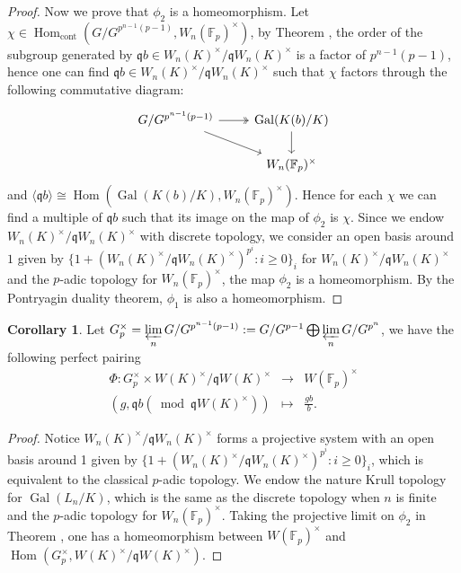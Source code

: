 \documentclass{proc-l}
\theoremstyle{definition}
\newtheorem{corollary}[theorem]{Corollary}
\theoremstyle{remark}
\numberwithin{equation}{section}
\DeclareMathOperator{\Gal}{Gal}
\DeclareMathOperator{\Hom}{Hom}
\DeclareMathOperator{\cont}{cont}
\begin{document}
{\begin{proof}
Now we prove that $\phi_2$ is a homeomorphism. %
Let $\chi\in \Hom_{\cont}(G/G^{p^{n-1}(p-1)},W_n(\mathbb F_p)^\times)$, by Theorem \boxed{\ref{038}}, the order of the subgroup generated by $\mathfrak qb\in W_n(K)^\times/\mathfrak qW_n(K)^\times$ is a factor of $p^{n-1}(p-1)$, hence one can find $\mathfrak qb\in W_n(K)^\times/\mathfrak qW_n(K)^\times$ such that $\chi$ factors through the following commutative diagram:
$$\begin{tikzcd}
  G/G^{p^{n-1}(p-1)} \arrow[r, twoheadrightarrow] \arrow[dr, rightarrow]
    & \Gal(K( b)/K) \arrow[d]\\
&W_n(\mathbb F_p)^\times \end{tikzcd}$$
and $\langle \mathfrak qb\rangle\cong\Hom(\Gal(K(b)/K),W_n(\mathbb F_p)^\times)$. Hence for each $\chi$ we can find a multiple of $\mathfrak qb$ such that its image on the map of $\phi_2$ is $\chi$. Since we endow $W_n(K)^\times/\mathfrak qW_n(K)^\times$ with discrete topology, we consider an open basis around $1$ given by $\{1+(W_n(K)^\times/\mathfrak qW_n(K)^\times)^{p^i}:i\geq0\}_i$ for $W_n(K)^\times/\mathfrak qW_n(K)^\times$ and the $p$-adic topology for $W_n(\mathbb F_p)^\times$, the map $\phi_2$ is a homeomorphism. By the Pontryagin duality theorem, $\phi_1$ is also a homeomorphism. 
\end{proof}
\begin{corollary}{\label {cor14}}
Let $G_p^\times=\varprojlim\limits_nG/G^{p^{n-1}(p-1)}:=G/G^{p-1}\bigoplus\varprojlim\limits_nG/G^{p^{n}}$, we have the following perfect pairing %
\begin{eqnarray*}
\Phi:G_p^\times\times W(K)^\times/\mathfrak qW(K)^\times&\rightarrow& W(\mathbb F_p)^\times\\
(g,\mathfrak q b(\bmod \mathfrak qW(K)^\times))&\mapsto&\frac{gb}{b}.
\end{eqnarray*}
\end{corollary}
\begin{proof}
Notice $W_n(K)^\times/\mathfrak qW_n(K)^\times$ forms a projective system with an open basis around 1 given by $\{1+(W_n(K)^\times/\mathfrak qW_n(K)^\times)^{p^i}:i\geq0\}_i$, which is equivalent to the classical $p$-adic topology. We endow the nature Krull topology for $\Gal(L_{n}/K)$, which is the same as the discrete topology when $n$ is finite and the $p$-adic topology for $W_n(\mathbb F_p)^\times$.  Taking the projective limit on $\phi_2$ in Theorem \boxed{\ref{thm3}}, one has a homeomorphism between $W(\mathbb F_p)^\times$ and $\Hom(G_p^\times,W(K)^\times/\mathfrak qW(K)^\times)$.
\end{proof}
}
\end{document}
